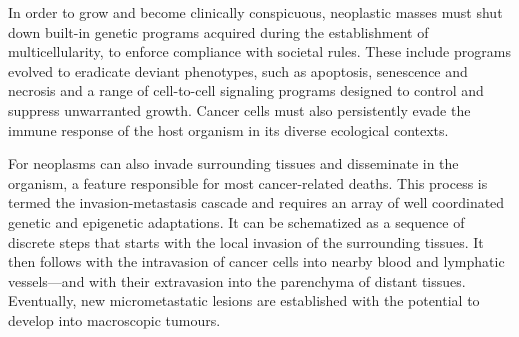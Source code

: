 
In order to grow and become clinically conspicuous, neoplastic masses
must shut down \mbox{built-in} genetic programs acquired during the
establishment of multicellularity, to enforce compliance with societal
rules.  These include programs evolved to eradicate deviant
phenotypes, such as apoptosis, senescence and necrosis and a range of
\mbox{cell-to-cell} signaling programs designed to control and
suppress unwarranted growth.  Cancer cells must also persistently
evade the immune response of the host organism in its diverse
ecological contexts.

For neoplasms can also invade surrounding tissues and disseminate in the
organism, a feature responsible for most \mbox{cancer-related} deaths.  This
process is termed the \mbox{invasion-metastasis}
cascade\cite{valastyan_tumor_2011} and requires an array of well coordinated
genetic and epigenetic adaptations.  It can be schematized as a sequence of
discrete steps that starts with the local invasion of the surrounding tissues.
It then follows with the intravasion of cancer cells into nearby blood and
lymphatic vessels---and with their extravasion into the parenchyma of distant
tissues.  Eventually, new micrometastatic lesions are established with the
potential to develop into macroscopic tumours.



